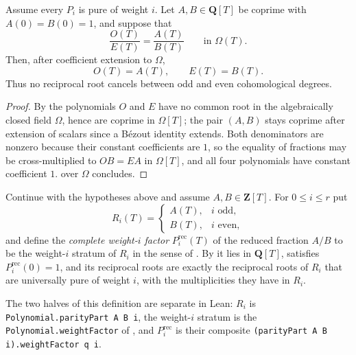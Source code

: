\begin{proposition}
\label{prop:zla-parity-identification}
\leanok
Assume every $P_i$ is pure of weight $i$.  Let $A,B\in\mathbf Q[T]$ be
coprime with $A(0)=B(0)=1$, and suppose that
\[
  \frac{O(T)}{E(T)}=\frac{A(T)}{B(T)}
  \qquad\text{in }\Omega(T).
\]
Then, after coefficient extension to $\Omega$,
\[
  O(T)=A(T),\qquad E(T)=B(T).
\]
Thus no reciprocal root cancels between odd and even cohomological degrees.
\end{proposition}
\begin{proof}
\leanok
By  the polynomials $O$ and $E$ have no common
root in the algebraically closed field $\Omega$, hence are coprime in
$\Omega[T]$; the pair $(A,B)$ stays coprime after extension of scalars since a
Bézout identity extends.  Both denominators are nonzero because their constant
coefficients are $1$, so the equality of fractions may be cross-multiplied to
$OB=EA$ in $\Omega[T]$, and all four polynomials have constant coefficient
$1$.   over $\Omega$ concludes.
\end{proof}

\begin{definition}
\label{def:zla-complete-weight-factor}
\leanok
Continue with the hypotheses above and assume $A,B\in\mathbf Z[T]$.  For
$0\leq i\leq r$ put
\[
  R_i(T)=
  \begin{cases}
    A(T),&i\text{ odd},\\
    B(T),&i\text{ even},
  \end{cases}
\]
and define the \emph{complete weight-$i$ factor} $P_i^{\mathrm{rec}}(T)$ of
the reduced fraction $A/B$ to be the weight-$i$ stratum of $R_i$ in the sense
of .  By
 it lies in $\mathbf Q[T]$, satisfies
$P_i^{\mathrm{rec}}(0)=1$, and its reciprocal roots are exactly the
reciprocal roots of $R_i$ that are universally pure of weight $i$, with the
multiplicities they have in $R_i$.
\end{definition}

The two halves of this definition are separate in Lean: $R_i$ is
\texttt{Polynomial.parityPart A B i}, the weight-$i$ stratum is the
\texttt{Polynomial.weightFactor} of , and
$P_i^{\mathrm{rec}}$ is their composite
\texttt{(parityPart A B i).weightFactor q i}.

